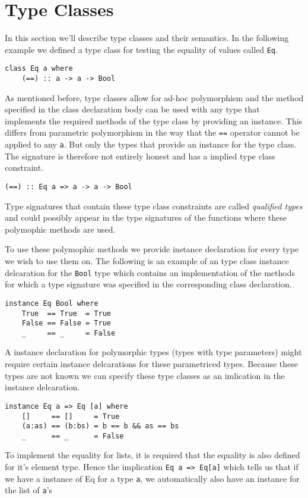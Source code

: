 \section{Type Classes}
In this section we'll describe type classes and their semantics. In the
following example we defined a type class for testing the equality of values
called \texttt{Eq}.

\begin{verbatim}
class Eq a where
    (==) :: a -> a -> Bool
\end{verbatim}

As mentioned before, type classes allow for ad-hoc polymorphism and the method
specified in the class declaration body can be used with any type that
implements the required methods of the type class by providing an instance.
This differs from parametric polymorphism in the way that the \texttt{==}
operator cannot be applied to any \texttt{a}. But only the types that provide an
instance for the type class. The signature is therefore not entirely honest and
has a implied type class constraint.
\begin{verbatim}
(==) :: Eq a => a -> a -> Bool
\end{verbatim}
Type signatures that contain these type class constraints are called
\textit{qualified types} and could possibly appear in the type signatures of the
functions where these polymophic methods are used.

To use these polymophic methods we provide instance declaration for every type
we wish to use them on. The following is an example of an type class instance
delcaration for the \texttt{Bool} type which contains an implementation of the
methods for which a type signature was specified in the corresponding class
declaration.
\begin{verbatim}
instance Eq Bool where
    True  == True  = True
    False == False = True
    _     == _     = False
\end{verbatim}

A instance declaration for polymorphic types (types with type parameters) might
require certain instance delcarations for these parametriced types. Because
these types are not known we can specify these type classes as an imlication in
the instance delcaration.
\begin{verbatim}
instance Eq a => Eq [a] where
    []     == []     = True
    (a:as) == (b:bs) = b == b && as == bs
    _      == _      = False
\end{verbatim}
To implement the equality for lists, it is required that the equality is also
defined for it's element type. Hence the implication \texttt{Eq a => Eq[a]}
which tells us that if we have a instance of Eq for a type \texttt{a}, we
automatically also have an instance for the list of \texttt{a}'s

